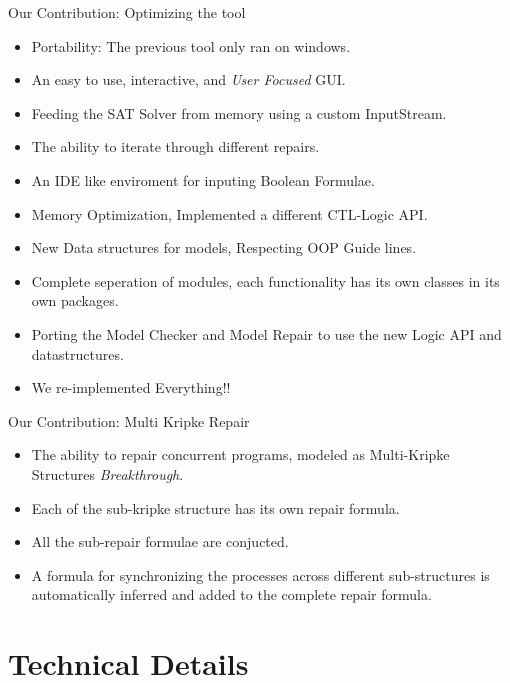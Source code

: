 \documentclass{bredelebeamer}
\begin{document}
\begin{frame}{Our Contribution: Optimizing the tool}
\begin{itemize}
\item Portability: The previous tool only ran on windows.
\item An easy to use, interactive, and \emph{User Focused} GUI.
\item Feeding the SAT Solver from memory using a custom InputStream.
\item The ability to iterate through different repairs.
\item An IDE like enviroment for inputing Boolean Formulae.
\item Memory Optimization, Implemented a different CTL-Logic API.
\item New Data structures for models, Respecting OOP Guide lines.
\item Complete seperation of modules, each functionality has its own classes in its own packages.
\item Porting the Model Checker and Model Repair to use the new Logic API and datastructures.
\item We re-implemented Everything!!
\end{itemize}
\end{frame}

\begin{frame}{Our Contribution: Multi Kripke Repair}
\begin{itemize}
\item The ability to repair concurrent programs, modeled as Multi-Kripke Structures \emph{Breakthrough}.
\item Each of the sub-kripke structure has its own repair formula.
\item All the sub-repair formulae are conjucted. 
\item A formula for synchronizing the processes across different sub-structures is automatically inferred and added to the complete repair formula.
\end{itemize}
\end{frame}

\section{Technical Details} 
\end{document}
